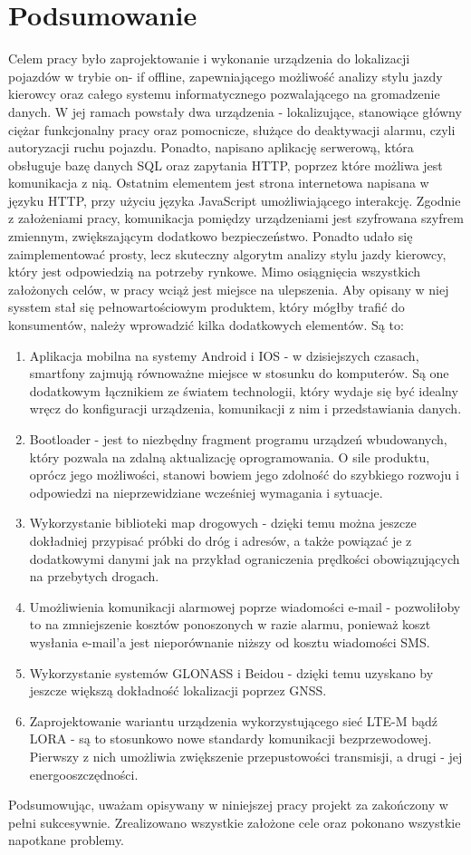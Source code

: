 \chapter{Podsumowanie}
\label{summary}

Celem pracy było zaprojektowanie i wykonanie urządzenia do lokalizacji pojazdów w trybie on- if offline, zapewniającego możliwość analizy stylu jazdy kierowcy oraz całego systemu informatycznego pozwalającego na gromadzenie danych. W jej ramach powstały dwa urządzenia - lokalizujące, stanowiące główny ciężar funkcjonalny pracy oraz pomocnicze, służące do deaktywacji alarmu, czyli autoryzacji ruchu pojazdu. Ponadto, napisano aplikację serwerową, która obsługuje bazę danych SQL oraz zapytania HTTP, poprzez które możliwa jest komunikacja z nią. Ostatnim elementem jest strona internetowa napisana w języku HTTP, przy użyciu języka JavaScript umożliwiającego interakcję. Zgodnie z założeniami pracy, komunikacja pomiędzy urządzeniami jest szyfrowana szyfrem zmiennym, zwiększającym dodatkowo bezpieczeństwo. Ponadto udało się zaimplementować prosty, lecz skuteczny algorytm analizy stylu jazdy kierowcy, który jest odpowiedzią na potrzeby rynkowe. 
Mimo osiągnięcia wszystkich założonych celów, w pracy wciąż jest miejsce na ulepszenia. Aby opisany w niej sysstem stał się pełnowartościowym produktem, który mógłby trafić do konsumentów, należy wprowadzić kilka dodatkowych elementów. Są to:

\begin{enumerate}
\item Aplikacja mobilna na systemy Android i IOS - w dzisiejszych czasach, smartfony zajmują równoważne miejsce w stosunku do komputerów. Są one dodatkowym łącznikiem ze światem technologii, który wydaje się być idealny wręcz do konfiguracji urządzenia, komunikacji z nim i przedstawiania danych.
\item Bootloader - jest to niezbędny fragment programu urządzeń wbudowanych, który pozwala na zdalną aktualizację oprogramowania. O sile produktu, oprócz jego możliwości, stanowi bowiem jego zdolność do szybkiego rozwoju i odpowiedzi na nieprzewidziane wcześniej wymagania i sytuacje.
\item Wykorzystanie biblioteki map drogowych - dzięki temu można jeszcze dokładniej przypisać próbki do dróg i adresów, a także powiązać je z dodatkowymi danymi jak na przykład ograniczenia prędkości obowiązujących na przebytych drogach.
\item Umożliwienia komunikacji alarmowej poprze wiadomości e-mail - pozwoliłoby to na zmniejszenie kosztów ponoszonych w razie alarmu, ponieważ koszt wysłania e-mail'a jest nieporównanie niższy od kosztu wiadomości SMS.
\item Wykorzystanie systemów GLONASS i Beidou - dzięki temu uzyskano by jeszcze większą dokładność lokalizacji poprzez GNSS.
\item Zaprojektowanie wariantu urządzenia wykorzystującego sieć LTE-M bądź LORA - są to stosunkowo nowe standardy komunikacji bezprzewodowej. Pierwszy z nich umożliwia zwiększenie przepustowości transmisji, a drugi - jej energooszczędności.
\end{enumerate} 

Podsumowując, uważam opisywany w niniejszej pracy projekt za zakończony w pełni sukcesywnie. Zrealizowano wszystkie założone cele oraz pokonano wszystkie napotkane problemy. 